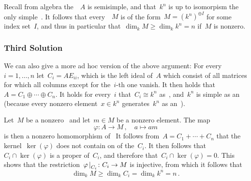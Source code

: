 Recall from algebra the~{\kalg}~$A$ is semisimple, and that~$k^n$ is up to isomorpism the only simple~{\Amod}.
It follows that every~{\Amod}~$M$ is of the form~$M = (k^n)^{\oplus I}$ for some index set~$I$, and thus in particular that~$\dim_k M \geq \dim_k k^n = n$ if~$M$ is nonzero.



\subsubsection{Third Solution}

We can also give a more ad hoc version of the above argument:
For every~$i = 1, \dotsc, n$ let~$C_i = A E_{ii}$, which is the left ideal of~$A$ which consist of all matrices for which all columns except for the~$i$-th one vanish.
It then holds that~$A = C_1 \oplus \dotsb \oplus C_n$.
It holds for every~$i$ that~$C_i \cong k^n$ as~{\Amod}, and~$k^n$ is simple as an~{\Amod} (because every nonzero element~$x \in k^n$ generates~$k^n$ as an~{\Amod}).

Let~$M$ be a nonzero~{\Amod} and let~$m \in M$ be a nonzero element.
The map
\[
          \varphi
  \colon  A
  \to     M \,,
  \quad   a
  \mapsto am
\]
is then a nonzero homomorphism of~{\Amod}
It follows from~$A = C_1 + \dotsb + C_n$ that the kernel~$\ker(\varphi)$ does not contain on of the~$C_i$.
It then follows that~$C_i \cap \ker(\varphi)$ is a proper {\Asmod} of~$C_i$, and therefore that~$C_i \cap \ker(\varphi) = 0$.
This shows that the restriction~$\restrict{\varphi}{C_i} \colon C_i \to M$ is injective, from which it follows that
\[
        \dim_k M
  \geq  \dim_k C_i
  =     \dim_k k^n
  =     n \,.
\]




